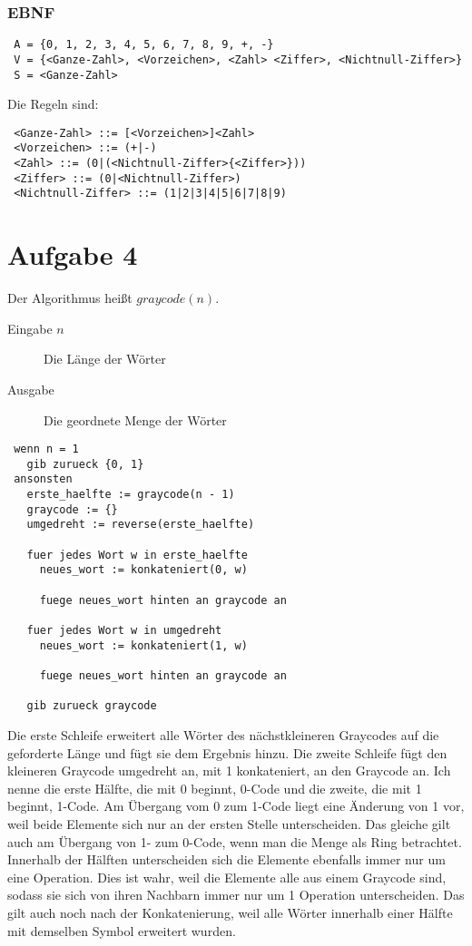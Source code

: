 \documentclass[a4paper,10pt]{article}
\begin{document}
\subsubsection*{EBNF}
\begin{lstlisting}
 A = {0, 1, 2, 3, 4, 5, 6, 7, 8, 9, +, -}
 V = {<Ganze-Zahl>, <Vorzeichen>, <Zahl> <Ziffer>, <Nichtnull-Ziffer>}
 S = <Ganze-Zahl>
\end{lstlisting}

Die Regeln sind:
\begin{lstlisting}
 <Ganze-Zahl> ::= [<Vorzeichen>]<Zahl>
 <Vorzeichen> ::= (+|-)
 <Zahl> ::= (0|(<Nichtnull-Ziffer>{<Ziffer>}))
 <Ziffer> ::= (0|<Nichtnull-Ziffer>)
 <Nichtnull-Ziffer> ::= (1|2|3|4|5|6|7|8|9)
\end{lstlisting}

\section*{Aufgabe 4}

Der Algorithmus heißt $graycode(n)$.

\begin{description}
 \item[Eingabe $n$] Die Länge der Wörter
 \item[Ausgabe] Die geordnete Menge der Wörter
\end{description}

\begin{lstlisting}
 wenn n = 1
   gib zurueck {0, 1}
 ansonsten
   erste_haelfte := graycode(n - 1)
   graycode := {}
   umgedreht := reverse(erste_haelfte)
   
   fuer jedes Wort w in erste_haelfte
     neues_wort := konkateniert(0, w)
     
     fuege neues_wort hinten an graycode an
   
   fuer jedes Wort w in umgedreht
     neues_wort := konkateniert(1, w)
     
     fuege neues_wort hinten an graycode an
   
   gib zurueck graycode
\end{lstlisting}

Die erste Schleife erweitert alle Wörter des nächstkleineren Graycodes auf die geforderte Länge und fügt sie dem Ergebnis hinzu.
Die zweite Schleife fügt den kleineren Graycode umgedreht an, mit 1 konkateniert, an den Graycode an.
Ich nenne die erste Hälfte, die mit 0 beginnt, 0-Code und die zweite, die mit 1 beginnt, 1-Code.
Am Übergang vom 0 zum 1-Code liegt eine Änderung von 1 vor, weil beide Elemente sich nur an der ersten Stelle unterscheiden.
Das gleiche gilt auch am Übergang von 1- zum 0-Code, wenn man die Menge als Ring betrachtet.
Innerhalb der Hälften unterscheiden sich die Elemente ebenfalls immer nur um eine Operation.
Dies ist wahr, weil die Elemente alle aus einem Graycode sind, sodass sie sich von ihren Nachbarn immer nur um 1 Operation unterscheiden.
Das gilt auch noch nach der Konkatenierung, weil alle Wörter innerhalb einer Hälfte mit demselben Symbol erweitert wurden.
\end{document}
